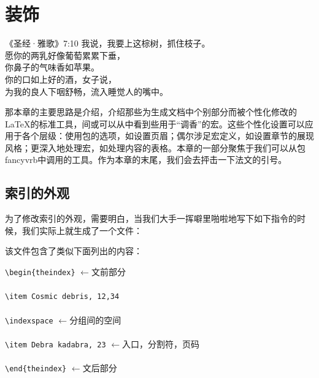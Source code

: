 \chapter{装饰}

\begin{epigraphe}{《圣经·雅歌》7:10}
    我说，我要上这棕树，抓住枝子。\\愿你的两乳好像葡萄累累下垂，\\你鼻子的气味香如苹果。\\你的口如上好的酒，女子说，\\为我的良人下咽舒畅，流入睡觉人的嘴中。
\end{epigraphe}

那本章的主要思路是介绍，介绍那些为生成文档中个别部分而被个性化修改的\LaTeX 的标准工具，间或可以从中看到些用于``调香''的宏。这些个性化设置可以应用于各个层级：使用包的选项，如设置页眉；偶尔涉足宏定义，如设置章节的展现风格；更深入地处理宏，如处理内容的表格。本章的一部分聚焦于我们可以从包\textsf{fancyvrb}中调用的工具。作为本章的末尾，我们会去抨击一下法文的引号。

\section{索引的外观} %

为了修改索引的外观，需要明白，当我们大手一挥噼里啪啦地写下如下指令的时候，我们实际上就生成了一个文件：


该文件包含了类似下面列出的内容：

\begin{dmd}
\verb|\begin{theindex}| \quad$\leftarrow$\textsf{文前部分}\\
~\\
\verb|\item Cosmic debris, 12,34|\\
~\\
\verb|\indexspace| \quad$\leftarrow$\textsf{分组间的空间}\\
~\\
\verb|\item Debra kadabra, 23| \quad$\leftarrow$\textsf{入口，分割符，页码}\\
~\\
\verb|\end{theindex}| \quad$\leftarrow$\textsf{文后部分}
\end{dmd}

